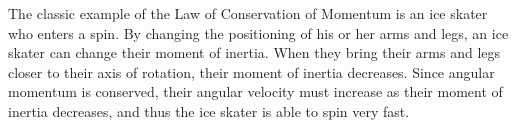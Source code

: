  The classic example of the Law of Conservation of Momentum is an ice skater who enters a spin.  By changing the positioning of his or her arms and legs, an ice skater can change their moment of inertia.  When they bring their arms and legs closer to their axis of rotation, their moment of inertia decreases.  Since angular momentum is conserved, their angular velocity must increase as their moment of inertia decreases, and thus the ice skater is able to spin very fast. 
 
	
	

		


	


